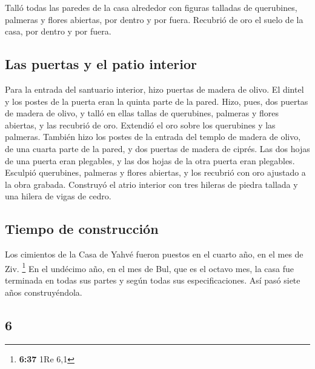 \begin{paracol}{2}
 Talló todas las paredes de la casa alrededor con figuras
talladas de querubines, palmeras y flores abiertas, por dentro y por
fuera.  Recubrió de oro el suelo de la casa, por dentro y
por fuera.

\hypertarget{las-puertas-y-el-patio-interior}{%
\subsection{Las puertas y el patio
interior}\label{las-puertas-y-el-patio-interior}}

 Para la entrada del santuario interior, hizo puertas de
madera de olivo. El dintel y los postes de la puerta eran la quinta
parte de la pared.  Hizo, pues, dos puertas de madera de
olivo, y talló en ellas tallas de querubines, palmeras y flores
abiertas, y las recubrió de oro. Extendió el oro sobre los querubines y
las palmeras.  También hizo los postes de la entrada del
templo de madera de olivo, de una cuarta parte de la pared,
 y dos puertas de madera de ciprés. Las dos hojas de una
puerta eran plegables, y las dos hojas de la otra puerta eran plegables.
 Esculpió querubines, palmeras y flores abiertas, y los
recubrió con oro ajustado a la obra grabada.  Construyó
el atrio interior con tres hileras de piedra tallada y una hilera de
vigas de cedro.

\hypertarget{tiempo-de-construcciuxf3n}{%
\subsection{Tiempo de construcción}\label{tiempo-de-construcciuxf3n}}

 Los cimientos de la Casa de Yahvé fueron puestos en el
cuarto año, en el mes de Ziv. \footnote{\textbf{6:37} 1Re 6,1}
 En el undécimo año, en el mes de Bul, que es el octavo
mes, la casa fue terminada en todas sus partes y según todas sus
especificaciones. Así pasó siete años construyéndola.

\switchcolumn
\begin{otherlanguage}{english}

\hypertarget{section-11}{%
\section{6}\label{section-11}}


\end{otherlanguage}
\end{paracol}
